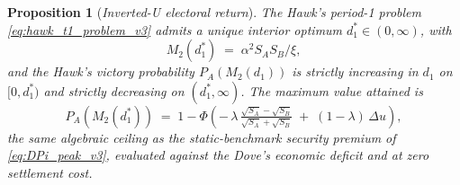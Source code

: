\documentclass[11pt,twoside]{extarticle}
\newtheorem{proposition}{Proposition}
\begin{document}
\begin{proposition}[\emph{Inverted-U electoral return}]\label{thm:inverted_U_v3}
The Hawk's period-1 problem \eqref{eq:hawk_t1_problem_v3} admits a unique interior optimum $d_1^*\in(0,\infty)$, with
\begin{equation}\label{eq:d1_optimum_v3}
    M_2(d_1^*)\;=\;\alpha^2 S_A S_B/\xi,
\end{equation}
and the Hawk's victory probability $P_A(M_2(d_1))$ is strictly increasing in $d_1$ on $[0,d_1^*)$ and strictly decreasing on $(d_1^*,\infty)$. The maximum value attained is
\begin{equation}\label{eq:Hawk_win_max_v3}
    P_A(M_2(d_1^*))\;=\;1-\Phi\!\left(-\,\lambda\,\tfrac{\sqrt{S_A}-\sqrt{S_B}}{\sqrt{S_A}+\sqrt{S_B}}\;+\;(1-\lambda)\,\Delta u\right),
\end{equation}
the same algebraic ceiling as the static-benchmark security premium of \eqref{eq:DPi_peak_v3}, evaluated against the Dove's economic deficit and at zero settlement cost.
\end{proposition}
\end{document}
